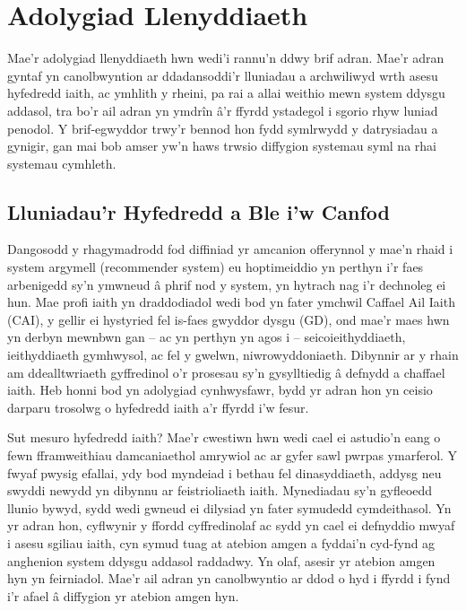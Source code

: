 \chapter{Adolygiad Llenyddiaeth}

Mae'r adolygiad llenyddiaeth hwn wedi'i rannu'n ddwy brif adran. Mae'r adran gyntaf yn canolbwyntion ar ddadansoddi'r lluniadau a archwiliwyd wrth asesu hyfedredd iaith, ac ymhlith y rheini, pa rai a allai weithio mewn system ddysgu addasol, tra bo'r ail adran yn ymdrîn â'r ffyrdd ystadegol i sgorio rhyw luniad penodol. Y brif-egwyddor trwy'r bennod hon fydd symlrwydd y datrysiadau a gynigir, gan mai bob amser yw'n haws trwsio diffygion systemau syml na rhai systemau cymhleth.

\section{Lluniadau'r Hyfedredd a Ble i'w Canfod}

Dangosodd y rhagymadrodd fod diffiniad yr amcanion offerynnol y mae’n rhaid i system argymell (recommender system) eu hoptimeiddio yn perthyn i’r faes arbenigedd sy’n ymwneud â phrif nod y system, yn hytrach nag i’r dechnoleg ei hun. Mae profi iaith yn draddodiadol wedi bod yn fater ymchwil Caffael Ail Iaith (CAI), y gellir ei hystyried fel is-faes gwyddor dysgu (GD), ond mae'r maes hwn yn derbyn mewnbwn gan – ac yn perthyn yn agos i – seicoieithyddiaeth, ieithyddiaeth gymhwysol, ac fel y gwelwn, niwrowyddoniaeth. Dibynnir ar y rhain am ddealltwriaeth
gyffredinol o’r prosesau sy’n gysylltiedig â defnydd a chaffael iaith. Heb honni bod yn adolygiad cynhwysfawr, bydd yr adran hon yn ceisio darparu trosolwg o hyfedredd iaith a'r ffyrdd i'w fesur.

Sut mesuro hyfedredd iaith? Mae'r cwestiwn hwn wedi cael ei astudio'n eang o fewn fframweithiau damcaniaethol amrywiol ac ar gyfer sawl pwrpas ymarferol. Y fwyaf pwysig efallai, ydy bod myndeiad i bethau fel dinasyddiaeth, addysg neu swyddi newydd yn dibynnu ar feistrioliaeth iaith. Mynediadau sy'n gyfleoedd llunio bywyd, sydd wedi gwneud ei dilysiad yn fater symudedd cymdeithasol. Yn yr adran hon, cyflwynir y ffordd cyffredinolaf ac sydd yn cael ei defnyddio mwyaf i asesu sgiliau iaith, cyn symud tuag at atebion amgen a fyddai'n cyd-fynd ag anghenion system ddysgu addasol raddadwy. Yn olaf, asesir yr atebion amgen hyn yn feirniadol. Mae'r ail adran yn canolbwyntio ar ddod o hyd i ffyrdd i fynd i'r afael â diffygion yr atebion amgen hyn.

